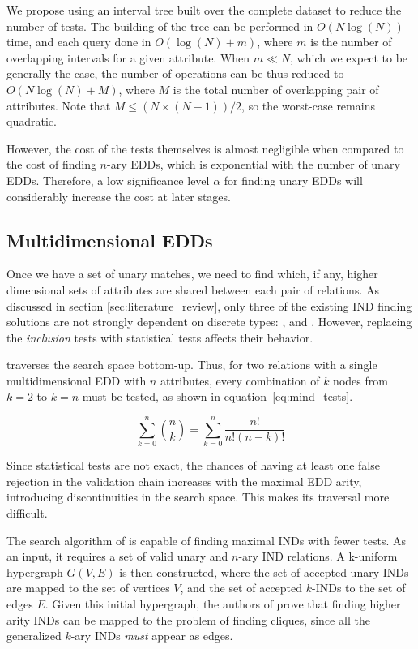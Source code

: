 We propose using an interval tree built over the complete dataset to reduce the number of tests.
The building of the tree can be performed in $O(N \log(N))$ time, and each query done in
$O(\log(N) + m)$, where $m$ is the number of overlapping intervals for a given attribute.
When $m \ll N$, which we expect to be generally the case, the number of operations can be thus
reduced to $O(N \log(N) + M)$, where $M$ is the total number of overlapping pair of attributes.
Note that $M \le (N \times (N - 1)) / 2$, so the worst-case remains quadratic.

However, the cost of the tests themselves is almost negligible when compared to the cost of
finding $n$-ary EDDs, which is exponential with
the number of unary EDDs. Therefore, a low significance level $\alpha$ for finding unary EDDs
will considerably increase the cost at later stages.

\subsection{Multidimensional EDDs}
\label{sec:multidimensional_edd}
Once we have a set of unary matches, we need to find which, if any, higher dimensional
sets of attributes are shared between each pair of relations. As discussed in section
\ref{sec:literature_review}, only three of the existing IND finding solutions are not strongly
dependent on discrete types: \Mind, \Zigzag and \Find.
However, replacing the \emph{inclusion} tests with statistical tests affects their behavior.

\Mind traverses the search space bottom-up. Thus, for two relations with a single
multidimensional EDD with $n$ attributes, every combination of $k$ nodes from $k = 2$
to $k = n$ must be tested, as shown in equation~\ref{eq:mind_tests}.

\begin{equation}
    \sum_{k=0}^{n}{\binom{n}{k}} = \sum_{k=0}^{n} \frac{n!}{n!(n - k)!}
    \label{eq:mind_tests}
\end{equation}

Since statistical tests are not exact, the chances of having
at least one false rejection in the validation chain
increases with the maximal EDD arity, introducing
discontinuities in the search space. This makes its traversal more difficult.

The search algorithm of \Find is capable of finding
maximal INDs with fewer tests. As an input, it requires a set of valid unary and $n$-ary
IND relations. A k-uniform hypergraph $G(V,E)$ is then constructed, where the set of accepted
unary INDs are mapped to the set of vertices $V$, and the set of accepted $k$-INDs to 
the set of edges $E$. 
Given this initial hypergraph, the authors of \Find prove that finding higher arity INDs can be
mapped to the problem of finding cliques, since all the generalized $k$-ary INDs
\emph{must} appear as edges.

